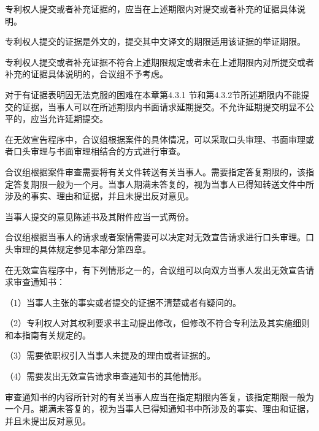 专利权人提交或者补充证据的，应当在上述期限内对提交或者补充的证据具体说明。

专利权人提交的证据是外文的，提交其中文译文的期限适用该证据的举证期限。

专利权人提交或者补充证据不符合上述期限规定或者未在上述期限内对所提交或者补充的证据具体说明的，合议组不予考虑。

对于有证据表明因无法克服的困难在本章第4.3.1 节和第4.3.2节所述期限内不能提交的证据，当事人可以在所述期限内书面请求延期提交。不允许延期提交明显不公平的，应当允许延期提交。

在无效宣告程序中，合议组根据案件的具体情况，可以采取口头审理、书面审理或者口头审理与书面审理相结合的方式进行审查。

合议组根据案件审查需要将有关文件转送有关当事人。需要指定答复期限的，该指定答复期限一般为一个月。当事人期满未答复的，视为当事人已得知转送文件中所涉及的事实、理由和证据，并且未提出反对意见。

当事人提交的意见陈述书及其附件应当一式两份。

合议组根据当事人的请求或者案情需要可以决定对无效宣告请求进行口头审理。口头审理的具体规定参见本部分第四章。

在无效宣告程序中，有下列情形之一的，合议组可以向双方当事人发出无效宣告请求审查通知书：

{\setlength{\parindent}{17.1bp}（1）当事人主张的事实或者提交的证据不清楚或者有疑问的。\par}

{\setlength{\parindent}{17.1bp}（2）专利权人对其权利要求书主动提出修改，但修改不符合专利法及其实施细则和本指南有关规定的。\par}

{\setlength{\parindent}{17.1bp}（3）需要依职权引入当事人未提及的理由或者证据的。\par}

{\setlength{\parindent}{17.1bp}（4）需要发出无效宣告请求审查通知书的其他情形。\par}

审查通知书的内容所针对的有关当事人应当在指定期限内答复，该指定期限一般为一个月。期满未答复的，视为当事人已得知通知书中所涉及的事实、理由和证据，并且未提出反对意见。

